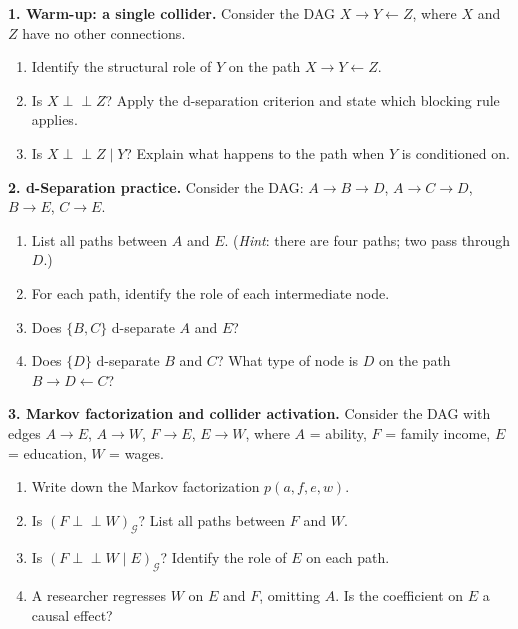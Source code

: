 \documentclass[
  a4paper,
]{book}
\providecommand{\tightlist}{%
  \setlength{\itemsep}{0pt}\setlength{\parskip}{0pt}}
\newcommand{\indep}{\perp\!\!\!\perp}
\newcommand{\Gcal}{\mathcal{G}}
\begin{document}
\textbf{1. Warm-up: a single collider.} Consider the DAG
\(X \to Y \leftarrow Z\), where \(X\) and \(Z\) have no other
connections.

\begin{enumerate}
\def\labelenumi{(\alph{enumi})}
\tightlist
\item
  Identify the structural role of \(Y\) on the path
  \(X \to Y \leftarrow Z\).
\item
  Is \(X \indep Z\)? Apply the d-separation criterion and state which
  blocking rule applies.
\item
  Is \(X \indep Z \mid Y\)? Explain what happens to the path when \(Y\)
  is conditioned on.
\end{enumerate}

\textbf{2. d-Separation practice.} Consider the DAG: \(A \to B \to D\),
\(A \to C \to D\), \(B \to E\), \(C \to E\).

\begin{enumerate}
\def\labelenumi{(\alph{enumi})}
\tightlist
\item
  List all paths between \(A\) and \(E\). (\emph{Hint}: there are four
  paths; two pass through \(D\).)
\item
  For each path, identify the role of each intermediate node.
\item
  Does \(\{B, C\}\) d-separate \(A\) and \(E\)?
\item
  Does \(\{D\}\) d-separate \(B\) and \(C\)? What type of node is \(D\)
  on the path \(B \to D \leftarrow C\)?
\end{enumerate}

\textbf{3. Markov factorization and collider activation.} Consider the
DAG with edges \(A \to E\), \(A \to W\), \(F \to E\), \(E \to W\), where
\(A\) = ability, \(F\) = family income, \(E\) = education, \(W\) =
wages.

\begin{enumerate}
\def\labelenumi{(\alph{enumi})}
\tightlist
\item
  Write down the Markov factorization \(p(a, f, e, w)\).
\item
  Is \((F \indep W)_{\Gcal}\)? List all paths between \(F\) and \(W\).
\item
  Is \((F \indep W \mid E)_{\Gcal}\)? Identify the role of \(E\) on each
  path.
\item
  A researcher regresses \(W\) on \(E\) and \(F\), omitting \(A\). Is
  the coefficient on \(E\) a causal effect?
\end{enumerate}
\end{document}
